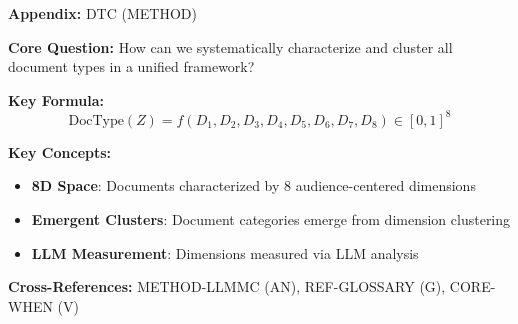 \begin{tcolorbox}[colback=blue!5!white, colframe=blue!75!black,
    title=Quick Reference: 8D Document Type Framework]
\textbf{Appendix:} DTC (METHOD)


\textbf{Core Question:} How can we systematically characterize and cluster
all document types in a unified framework?

\textbf{Key Formula:}
\begin{equation}
\text{DocType}(Z) = f(D_1, D_2, D_3, D_4, D_5, D_6, D_7, D_8) \in [0,1]^8
\end{equation}

\textbf{Key Concepts:}
\begin{itemize}[nosep]
\item \textbf{8D Space}: Documents characterized by 8 audience-centered dimensions
\item \textbf{Emergent Clusters}: Document categories emerge from dimension clustering
\item \textbf{LLM Measurement}: Dimensions measured via LLM analysis
\end{itemize}

\textbf{Cross-References:} METHOD-LLMMC (AN), REF-GLOSSARY (G), CORE-WHEN (V)
\end{tcolorbox}


